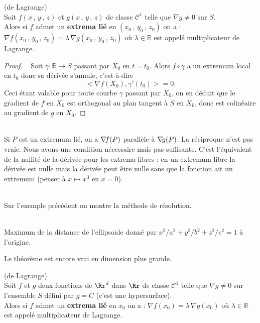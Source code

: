 \documentclass[12pt, class=report,crop=false]{standalone}
\begin{document}
{{{{\begin{theoreme}(de Lagrange)\\
Soit $f(x\,,\,y\,,\,z)$ et $g(x\,,\,y\,,\,z)$ de classe $\mathcal{C}^1$ telle que $\nabla g \neq 0$ sur $S$.\\
Alors si $f$ admet un {\bf extrema lié} en $(x_{0}\,,\,y_{0}\,,\,z_{0})$ on a : $\nabla f(x_{0}\,,\,y_{0}\,,\,z_{0}) = \lambda\, \nabla g(x_{0}\,,\,y_{0}\,,\,z_{0})$ o\`u $\lambda \in \mathbb{R}$ est appelé multiplicateur de Lagrange.
\end{theoreme}
\begin{proof} \ \rm 
Soit $\gamma:\mathbb R \to S$ passant par $X_0$ en $t=t_0$. Alors $f\circ \gamma$ a un extremum local en $t_0$ donc sa dérivée s'annule, c'est-\`a-dire
$$<\nabla f(X_0),\gamma '(t_0)>=0.$$
Ceci étant valable pour toute courbe $\gamma$ passant par $X_0$, on en déduit que le gradient de $f$ en $X_0$ est orthogonal au plan tangent \`a $S$ en $X_0$, donc est colinéaire au gradient de $g$ en $X_0$.
\end{proof}

\\
Si $P$ est un extremum lié, on a $\nabla\hspace{-0.6mm} f(P)$ parall\`ele \`a $\nabla\hspace{-0.6mm} g(P)$.
La réciproque n'est pas vraie. Nous avons une condition nécessaire mais pas suffisante. C'est l'équivalent de la nullité de la dérivée pour les extrema libres : en un extremum libre la dérivée est nulle mais la dérivée peut \^etre nulle sans que la fonction ait un extremum (penser \`a $x\mapsto x^3$ en $x=0$).  


\\
Sur l'exemple précédent on montre la méthode de résolution.

\\
Maximum de la distance de l'ellipsoide donné par $x^2/a^2+y^2/b^2+z^2/c^2=1$ \`a l'origine.

Le théor\`eme est encore vrai en dimension plus grande.
\begin{theoreme}(de Lagrange)\\
Soit $f$ et $g$ deux fonctions de $\Rr^d$ dans $\Rr$  de classe $\mathcal{C}^1$ telle que $\nabla g \neq 0$ sur l'ensemble $S$ défini par $g=C$ (c'est une hypersurface).\\
Alors si $f$ admet un {\bf extrema lié} en $x_0$ on a : $\nabla f(x_{0}) = \lambda\, \nabla g(x_{0})$ o\`u $\lambda \in \mathbb{R}$ est appelé multiplicateur de Lagrange.
\end{theoreme}


}}}}
\end{document}
